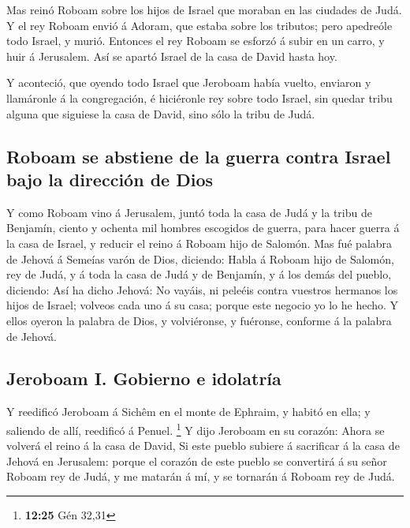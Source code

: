  Mas reinó Roboam sobre los hijos de Israel que moraban
en las ciudades de Judá.  Y el rey Roboam envió á Adoram,
que estaba sobre los tributos; pero apedreóle todo Israel, y murió.
Entonces el rey Roboam se esforzó á subir en un carro, y huir á
Jerusalem.  Así se apartó Israel de la casa de David
hasta hoy.

 Y aconteció, que oyendo todo Israel que Jeroboam había
vuelto, enviaron y llamáronle á la congregación, é hiciéronle rey sobre
todo Israel, sin quedar tribu alguna que siguiese la casa de David, sino
sólo la tribu de Judá.

\hypertarget{roboam-se-abstiene-de-la-guerra-contra-israel-bajo-la-direcciuxf3n-de-dios}{%
\subsection{Roboam se abstiene de la guerra contra Israel bajo la
dirección de
Dios}\label{roboam-se-abstiene-de-la-guerra-contra-israel-bajo-la-direcciuxf3n-de-dios}}

 Y como Roboam vino á Jerusalem, juntó toda la casa de
Judá y la tribu de Benjamín, ciento y ochenta mil hombres escogidos de
guerra, para hacer guerra á la casa de Israel, y reducir el reino á
Roboam hijo de Salomón.  Mas fué palabra de Jehová á
Semeías varón de Dios, diciendo:  Habla á Roboam hijo de
Salomón, rey de Judá, y á toda la casa de Judá y de Benjamín, y á los
demás del pueblo, diciendo:  Así ha dicho Jehová: No
vayáis, ni peleéis contra vuestros hermanos los hijos de Israel; volveos
cada uno á su casa; porque este negocio yo lo he hecho. Y ellos oyeron
la palabra de Dios, y volviéronse, y fuéronse, conforme á la palabra de
Jehová.

\hypertarget{jeroboam-i.-gobierno-e-idolatruxeda}{%
\subsection{Jeroboam I. Gobierno e
idolatría}\label{jeroboam-i.-gobierno-e-idolatruxeda}}

 Y reedificó Jeroboam á Sichêm en el monte de Ephraim, y
habitó en ella; y saliendo de allí, reedificó á Penuel. \footnote{\textbf{12:25}
  Gén 32,31}  Y dijo Jeroboam en su corazón: Ahora se
volverá el reino á la casa de David,  Si este pueblo
subiere á sacrificar á la casa de Jehová en Jerusalem: porque el corazón
de este pueblo se convertirá á su señor Roboam rey de Judá, y me matarán
á mí, y se tornarán á Roboam rey de Judá.

